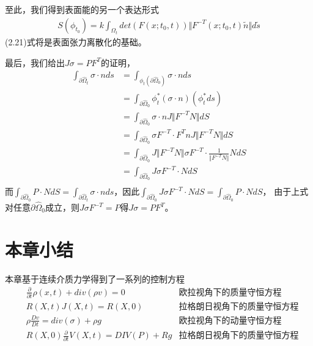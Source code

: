 至此，我们得到表面能的另一个表达形式
\begin{equation}
    \begin{split}
        S(\phi_{t_0}) = k \int_{\Omega_t} det(F(x;t_0,t)) \Vert F^{-T}(x;t_0,t)\tilde{n}\Vert d\tilde{s}
    \end{split}
\end{equation}
(2.21)式将是表面张力离散化的基础。

最后，我们给出$J\sigma = PF^{T}$的证明，
\begin{align*}
    \int_{\partial \hat{\Omega}_{t}} \sigma \cdot n ds &= \int_{\phi_t (\partial \hat{\Omega}_{0})} \sigma\cdot n ds\\
    &= \int_{\partial \hat{\Omega}_0} \phi_t^*(\sigma\cdot n) (\phi_t^* ds)\\
    &= \int_{\partial \hat{\Omega}_0} \sigma\cdot n J \Vert F^{-T} N\Vert dS\\
    &= \int_{\partial \hat{\Omega}_0} \sigma F^{-T} \cdot F^{T}n J \Vert F^{-T} N\Vert dS\\
    &= \int_{\partial \hat{\Omega}_0} J\Vert F^{-T} N\Vert\sigma F^{-T} \cdot \frac{1}{\Vert F^{-T}N \Vert} N dS\\
    &= \int_{\partial \hat{\Omega}_0} J\sigma F^{-T} \cdot　N dS\\
\end{align*}
而$\int_{\partial \hat{\Omega}_{0}} P \cdot N dS = \int_{\partial \hat{\Omega}_{t}} \sigma \cdot n ds$，因此$\int_{\partial \hat{\Omega}_0} J\sigma F^{-T} \cdot　N dS = \int_{\partial \hat{\Omega}_0} P \cdot　N dS$，
由于上式对任意$\partial \hat{\Omega}_0$成立，则$J\sigma F^{-T}= P$得$J\sigma = PF^{T}$。


\section{本章小结}
本章基于连续介质力学得到了一系列的控制方程
\begin{align*}
    &\frac{\partial}{\partial t}\rho (x,t) + div(\rho v) = 0 & \text{欧拉视角下的质量守恒方程} \\
    &R(X,t)J(X,t) = R(X,0) & \text{拉格朗日视角下的质量守恒方程} \\
    &\rho \frac{Dv}{Dt} = div(\sigma) + \rho g & \text{欧拉视角下的动量守恒方程}\\
    &R(X,0)\frac{\partial}{\partial t} V(X,t) = DIV(P) + Rg &\text{拉格朗日视角下的质量守恒方程}
\end{align*}

